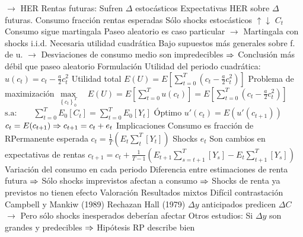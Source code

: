 \documentclass{nuevotema}
\begin{document}
\begin{esquemal}
				\4[] $\to$ HER
				\4 Rentas futuras:
				\4[] Sufren $\varDelta$ estocásticos
				\4[] Expectativas HER sobre $\varDelta$ futuras.
				\4 Consumo fracción rentas esperadas
				\4 Sólo shocks estocásticos $\uparrow \downarrow$ $C_t$
				\4 Consumo sigue martingala
				\4[] Paseo aleatorio es caso particular
				\4[] $\to$ Martingala con shocks i.i.d.
				\4[] Necesaria utilidad cuadrática
				\4[] Bajo supuestos más generales sobre f. de u.
				\4[] $\to$ Desviaciones de consumo medio son impredecibles
				\4[] $\Rightarrow$ Conclusión más débil que paseo aleatorio
			\3 Formulación
				\4 Utilidad del periodo cuadrática:
				\4[] $u(c_t) = c_t - \frac{a}{2} c_t^2$
				\4 Utilidad total
				\4[] $E(U) = E \left[ \sum_{t=0}^T \left( c_t - \frac{a}{2} c_t^2 \right) \right]$
				\4 Problema de maximización
				\4[] $\underset{\left\lbrace c_t \right\rbrace^T_0}{\max} \quad E(U) = E \left[ \sum_{t=0}^T u(c_t) \right] = E \left[ \sum_{t=0}^T \left( c_t - \frac{a}{2} c_t^2 \right) \right] $
				\4[] $\text{s.a:} \quad \quad \sum_{t=0}^T E_0 \left[ C_t \right] = \sum_{t=0}^T E_0 \left[ Y_t \right]$
				\4 Óptimo
				\4[] $ u'(c_t) = E\left( u'(c_{t+1}) \right)$
				\4[] $c_t = E(c_{t+1}) \Rightarrow c_{t+1} = c_t + e_t$
			\3 Implicaciones
				\4 Consumo es fracción de RPermanente esperada
				\4[] $c_t =  \frac{1}{T} \left( E_t \sum_{t}^T  \left[ Y_t \right] \right)$
				\4 Shocks $e_t$
				\4[] Son cambios en expectativas de rentas
				\4[] $c_{t+1} = c_t + \frac{1}{T-1} \left( E_{t+1} \sum_{s=t+1}^T [Y_s] - E_t \sum_{t+1}^T [Y_s] \right)$
				\4 Variación del consumo en cada periodo
				\4[] Diferencia entre estimaciones de renta futura
				\4[] $\Rightarrow$ Sólo shocks imprevistos afectan a consumo
				\4[] $\Rightarrow$ Shocks de renta ya previstos no tienen efecto
			\3 Valoración
				\4 Resultados mixtos
				\4 Difícil contrastación
				\4 Campbell y Mankiw (1989)
				\4[] Rechazan Hall (1979)
				\4[] $\varDelta y$ anticipados predicen $\varDelta C$
				\4[] $\to$ Pero sólo shocks inesperados deberían afectar
				\4 Otros estudios:
				\4[] Si $\varDelta y$ son grandes y predecibles
				\4[] $\Rightarrow$ Hipótesis RP describe bien

\end{esquemal}
\end{document}

